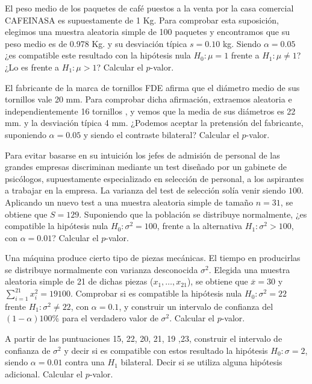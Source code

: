 \documentclass[12pt]{article}\usepackage[]{graphicx}\usepackage[]{color}
\begin{document}
\begin{prob}%
El peso medio de los paquetes de café puestos a la venta por la casa comercial CAFEINASA es
supuestamente de 1 Kg. Para comprobar esta suposición, elegimos una muestra aleatoria
simple de 100 paquetes y encontramos que su peso  medio es de 0.978 Kg. y su desviación
típica $s=0.10$ kg. Siendo $\alpha=0.05$ ¿es compatible este resultado con la hipótesis
nula $H_{0}:\mu=1$ frente a $H_{1}:\mu\not=1$? ¿Lo es frente a $H_{1}:\mu>1$? Calcular el $p$-valor.
\end{prob}

\begin{prob}
El fabricante de la marca de tornillos FDE afirma que el diámetro medio de sus tornillos
vale 20 mm. Para comprobar dicha afirmación, extraemos aleatoria e independientemente 16
tornillos , y vemos que la media de sus diámetros  es 22 mm. y la desviación típica 4 mm.
¿Podemos aceptar la pretensión del fabricante, suponiendo $\alpha=0.05$ y siendo el
contraste bilateral? Calcular el $p$-valor.
\end{prob}

\begin{prob}
Para evitar basarse en su intuición los jefes de admisión de
personal de las grandes empresas discriminan mediante un test
diseñado por un gabinete de psicólogos, supuestamente especializado
en selección de personal, a los aspirantes a trabajar en la empresa.
La varianza del test de selección solía venir siendo $100$.
Aplicando un nuevo test a una muestra aleatoria simple de tamaño
$n=31$, se obtiene que $S=129$. Suponiendo que la población se
distribuye normalmente, ¿es compatible la hipótesis nula
$H_{0}:\sigma^2=100$, frente a la alternativa $H_{1}:\sigma^2>100$,
con $\alpha=0.01$? Calcular el $p$-valor.
\end{prob}

\begin{prob}
Una máquina produce cierto tipo de piezas mecánicas. El tiempo en
producirlas se distribuye normalmente con varianza desconocida
$\sigma^2$. Elegida una muestra aleatoria simple de 21 de dichas
piezas ($x_{1},\ldots,x_{21}$), se obtiene que $\overline{x}=30$ y
$\sum_{i=1}^{21}x_{i}^2=19100.$ Comprobar si es compatible la
hipótesis nula $H_{0}:\sigma^2=22$ frente $H_{1}:\sigma^2\not=22$,
con $\alpha=0.1$, y construir un intervalo de confianza del
$(1-\alpha)100\%$ para el verdadero valor de $\sigma^2$. Calcular el $p$-valor.
\end{prob}

\begin{prob}
A partir de las puntuaciones 15, 22, 20, 21, 19 ,23, construir el intervalo de confianza de
$\sigma^2$ y decir si es compatible con estos resultado la hipótesis $H_{0}:\sigma=2$,
siendo $\alpha=0.01$ contra una $H_1$ bilateral. Decir si se utiliza alguna hipótesis adicional. Calcular el $p$-valor.
\end{prob}
\end{document}
